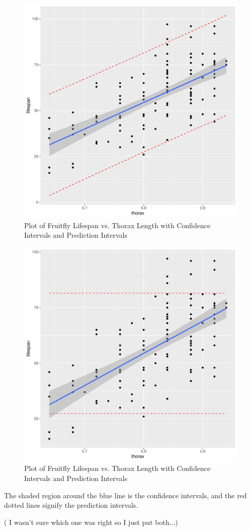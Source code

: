 \documentclass[12pt,letterpaper]{article}
\begin{document}
\begin{enumerate}
		
		\newpage
			\begin{figure} [h]
			\centering
			\includegraphics[width=0.7\linewidth]{conf_interval}
			\caption{Plot of Fruitfly Lifespan vs. Thorax Length with Confidence Intervals and Prediction Intervals}
			\label{fig:graph2}
		\end{figure}
	
				\begin{figure} [h]
		\centering
		\includegraphics[width=0.7\linewidth]{conf_interval2}
		\caption{Plot of Fruitfly Lifespan vs. Thorax Length with Confidence Intervals and Prediction Intervals}
		\label{fig:graph2}
	\end{figure}
\noindent The shaded region around the blue line is the confidence intervals, and the red dotted lines signify the prediction intervals.

( I wasn't sure which one was right so I just put both...)
\end{enumerate}
\end{document}
